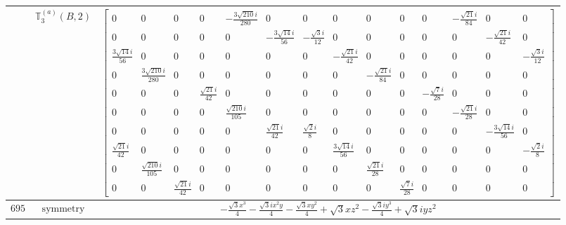 \documentclass[fleqn,8pt,landscape]{jsarticle}
\begin{document}
\begin{longtable}{ccc}
$  $ & $ \mathbb{T}_{3}^{(a)}(B,2) $ & $ \begin{bmatrix} 0 & 0 & 0 & 0 & - \frac{3 \sqrt{210} i}{280} & 0 & 0 & 0 & 0 & 0 & 0 & - \frac{\sqrt{21} i}{84} & 0 & 0 \\ 0 & 0 & 0 & 0 & 0 & - \frac{3 \sqrt{14} i}{56} & - \frac{\sqrt{3} i}{12} & 0 & 0 & 0 & 0 & 0 & - \frac{\sqrt{21} i}{42} & 0 \\ \frac{3 \sqrt{14} i}{56} & 0 & 0 & 0 & 0 & 0 & 0 & - \frac{\sqrt{21} i}{42} & 0 & 0 & 0 & 0 & 0 & - \frac{\sqrt{3} i}{12} \\ 0 & \frac{3 \sqrt{210} i}{280} & 0 & 0 & 0 & 0 & 0 & 0 & - \frac{\sqrt{21} i}{84} & 0 & 0 & 0 & 0 & 0 \\ 0 & 0 & 0 & \frac{\sqrt{21} i}{42} & 0 & 0 & 0 & 0 & 0 & 0 & - \frac{\sqrt{7} i}{28} & 0 & 0 & 0 \\ 0 & 0 & 0 & 0 & \frac{\sqrt{210} i}{105} & 0 & 0 & 0 & 0 & 0 & 0 & - \frac{\sqrt{21} i}{28} & 0 & 0 \\ 0 & 0 & 0 & 0 & 0 & \frac{\sqrt{21} i}{42} & \frac{\sqrt{2} i}{8} & 0 & 0 & 0 & 0 & 0 & - \frac{3 \sqrt{14} i}{56} & 0 \\ \frac{\sqrt{21} i}{42} & 0 & 0 & 0 & 0 & 0 & 0 & \frac{3 \sqrt{14} i}{56} & 0 & 0 & 0 & 0 & 0 & - \frac{\sqrt{2} i}{8} \\ 0 & \frac{\sqrt{210} i}{105} & 0 & 0 & 0 & 0 & 0 & 0 & \frac{\sqrt{21} i}{28} & 0 & 0 & 0 & 0 & 0 \\ 0 & 0 & \frac{\sqrt{21} i}{42} & 0 & 0 & 0 & 0 & 0 & 0 & \frac{\sqrt{7} i}{28} & 0 & 0 & 0 & 0 \end{bmatrix} $ \\ \hline
$ 695 $ & $ \text{symmetry} $ & $ - \frac{\sqrt{3} x^{3}}{4} - \frac{\sqrt{3} i x^{2} y}{4} - \frac{\sqrt{3} x y^{2}}{4} + \sqrt{3} x z^{2} - \frac{\sqrt{3} i y^{3}}{4} + \sqrt{3} i y z^{2} $ \\

\end{longtable}
\end{document}
